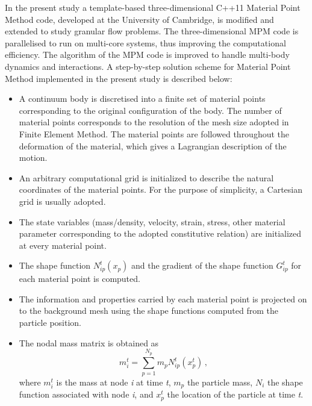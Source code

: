 In the present study a template-based three-dimensional C++11 Material Point 
Method code, developed at the University of Cambridge, is modified and extended 
to study granular flow problems. The three-dimensional MPM code is parallelised 
to run on multi-core systems, thus improving the computational efficiency. The 
algorithm of the MPM code is improved to handle multi-body dynamics and 
interactions. A step-by-step solution scheme for Material Point Method 
implemented in the present study is described below:

\begin{itemize}

\item
A continuum body is discretised into a finite set of material points 
corresponding to the original configuration of the body. The number of material 
points corresponds to the resolution of the mesh size adopted in Finite Element 
Method. The material points are followed throughout the deformation of the 
material, which gives a Lagrangian description of the motion. 

\item
An arbitrary computational grid is initialized to describe the natural 
coordinates of the material points. For the purpose of simplicity, a Cartesian 
grid is usually adopted. 

\item
The state variables (mass/density, velocity, strain, stress, other material 
parameter corresponding to the adopted constitutive relation) are initialized 
at every material point. 

\item
The shape function $N_{ip}^t(x_p)$ and the gradient of the shape function 
$G_{ip}^t$ for each material point is computed.

\item
The information and properties carried by each material point is projected on 
to the background mesh using the shape functions computed from the 
particle position. 

\item
The nodal mass matrix is obtained as
%
\begin{equation}
\mathit{m}_{\mathit{i}}^{\mathit{t}} = 
\sum\limits_{\mathit{p}=1}^{\mathit{N}_{\mathit{p}}} \mathit{m}_{\mathit{p}} 
\mathit{N}_{\mathit{ip}}^{\mathit{t}}(x^t_p) \,,
\end{equation}
%
where $\mathit{m}_{i}^{t}$ is the mass at node \textit{i} at time \textit{t}, 
$\mathit{m}_{\mathit{p}}$ the particle mass, $\mathit{N}_{\mathit{i}}$ the 
shape function associated with node \textit{i}, and 
$\mathit{x}_{\mathit{p}}^{\mathit{t}}$ the location of the particle at time
\textit{t}.


\end{itemize}
